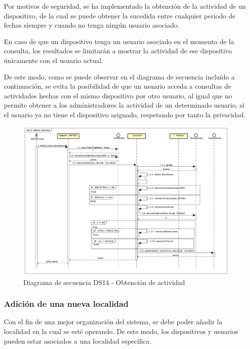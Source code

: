Por motivos de seguridad, se ha implementado la obtención de la actividad de un dispositivo, de la cual se puede obtener la sucedida entre cualquier periodo de fechas siempre y cuando no tenga ningún usuario asociado.

En caso de que un dispositivo tenga un usuario asociado en el momento de la consulta, los resultados se limitarán a mostrar la actividad de ese dispositivo únicamente con el usuario actual.

De este modo, como se puede observar en el diagrama de secuencia incluído a continuación, se evita la posibilidad de que un usuario acceda a consultas de actividades hechas con el mismo dispositivo por otro usuario, al igual que no permite obtener a los administradores la actividad de un determinado usuario, si el usuario ya no tiene el dispositivo asignado, respetando por tanto la privacidad.

\begin{figure}[H]
    \centering
    \includegraphics[width=14cm]{./img/sequence/diagram/ObtenerActividad.png}
    \caption{Diagrama de secuencia DS14 - Obtención de actividad}
    \label{fig:seq.GetTask}
\end{figure}


\subsubsection{Adición de una nueva localidad}

Con el fin de una mejor organización del sistema, se debe poder añadir la localidad en la cual se esté operando. De este modo, los dispositivos y usuarios pueden estar asociados a una localidad específica.

